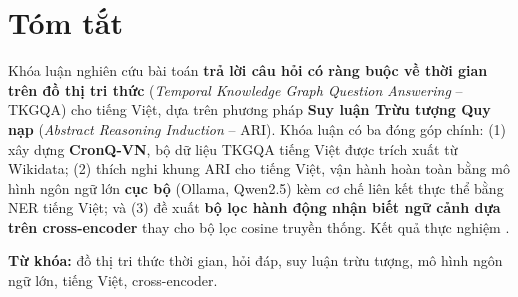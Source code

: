 \chapter*{Tóm tắt}

Khóa luận nghiên cứu bài toán \textbf{trả lời câu hỏi có ràng buộc về thời gian trên đồ thị
tri thức} (\textit{Temporal Knowledge Graph Question Answering} -- TKGQA) cho tiếng Việt, dựa
trên phương pháp \textbf{Suy luận Trừu tượng Quy nạp} (\textit{Abstract Reasoning Induction} --
ARI). Khóa luận có ba đóng góp chính: (1) xây dựng \textbf{CronQ-VN}, bộ dữ liệu TKGQA tiếng
Việt được trích xuất từ Wikidata; (2) thích nghi khung ARI cho tiếng Việt, vận hành hoàn toàn
bằng mô hình ngôn ngữ lớn \textbf{cục bộ} (Ollama, Qwen2.5) kèm cơ chế liên kết thực thể bằng
NER tiếng Việt; và (3) đề xuất \textbf{bộ lọc hành động nhận biết ngữ cảnh dựa trên
cross-encoder} thay cho bộ lọc cosine truyền thống. Kết quả thực nghiệm .

\bigskip
\noindent\textbf{Từ khóa:} đồ thị tri thức thời gian, hỏi đáp, suy luận trừu tượng, mô hình
ngôn ngữ lớn, tiếng Việt, cross-encoder.
